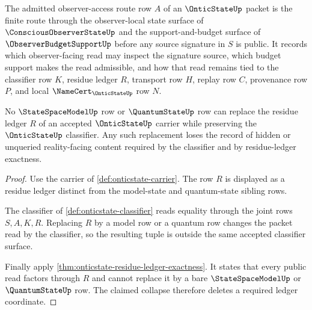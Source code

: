 \begin{definition}
\label{def:onticstate-access-route}
The admitted observer-access route row $A$ of an $\OnticStateUp$ packet is the finite route through the observer-local state surface of $\ConsciousObserverStateUp$ and the support-and-budget surface of $\ObserverBudgetSupportUp$ before any source signature in $S$ is public. It records which observer-facing read may inspect the signature source, which budget support makes the read admissible, and how that read remains tied to the classifier row $K$, residue ledger $R$, transport row $H$, replay row $C$, provenance row $P$, and local $\NameCert_{\OnticStateUp}$ row $N$.
\end{definition}

\begin{theorem}
\label{thm:onticstate-model-residue-noncollapse}
No $\StateSpaceModelUp$ row or $\QuantumStateUp$ row can replace the residue ledger $R$ of an accepted $\OnticStateUp$ carrier while preserving the $\OnticStateUp$ classifier. Any such replacement loses the record of hidden or unqueried reality-facing content required by the classifier and by residue-ledger exactness.
\end{theorem}
\begin{proof}
Use the carrier of \autoref{def:onticstate-carrier}. The row $R$ is displayed as a residue ledger distinct from the model-state and quantum-state sibling rows.

The classifier of \autoref{def:onticstate-classifier} reads equality through the joint rows $S,A,K,R$. Replacing $R$ by a model row or a quantum row changes the packet read by the classifier, so the resulting tuple is outside the same accepted classifier surface.

Finally apply \autoref{thm:onticstate-residue-ledger-exactness}. It states that every public read factors through $R$ and cannot replace it by a bare $\StateSpaceModelUp$ or $\QuantumStateUp$ row. The claimed collapse therefore deletes a required ledger coordinate.
\end{proof}

